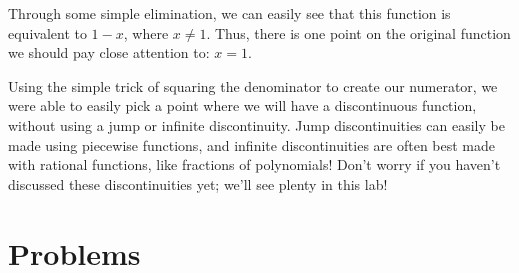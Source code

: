 \documentclass{ximera}
\begin{document}
Through some simple elimination, we can easily see that this function is equivalent to $1-x$, where $x \neq 1$. Thus, there is one point on the original function we should pay close attention to: $x=1$.

Using the simple trick of squaring the denominator to create our numerator, we were able to easily pick a point where we will have a discontinuous function, without using a jump or infinite discontinuity. Jump discontinuities can easily be made using piecewise functions, and infinite discontinuities are often best made with rational functions, like fractions of polynomials! Don't worry if you haven't discussed these discontinuities yet; we'll see plenty in this lab!

\section{Problems}
\end{document}
